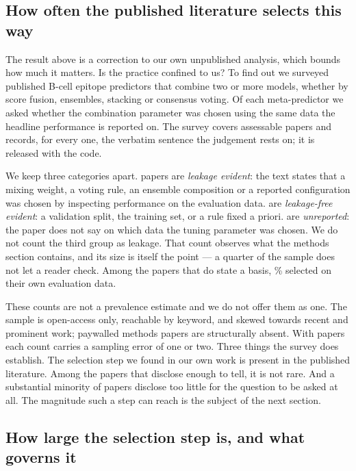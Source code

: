 \subsection{How often the published literature selects this way}
\label{sec:survey}

The result above is a correction to our own unpublished analysis, which bounds
how much it matters. Is the practice confined to us? To find out we surveyed
published B-cell epitope predictors that combine two or more models, whether
by score fusion, ensembles, stacking or consensus voting. Of each
meta-predictor we asked whether the combination parameter was chosen using the
same data the headline performance is reported on. The survey covers
\SurveyAssessed{} assessable papers and records, for every one, the verbatim
sentence the judgement rests on; it is released with the code.

We keep three categories apart. \SurveyLeakage{} papers are \emph{leakage
evident}: the text states that a mixing weight, a voting rule, an ensemble
composition or a reported configuration was chosen by inspecting performance
on the evaluation data. \SurveyClean{} are \emph{leakage-free evident}: a
validation split, the training set, or a rule fixed a priori.
\SurveyUnreported{} are \emph{unreported}: the paper does not say on which
data the tuning parameter was chosen. We do not count the third group as
leakage. That count observes what the methods section contains, and its size is
itself the point --- a quarter of the sample does not let a reader check.
Among the \SurveyStatingBasis{} papers that do state a basis,
\SurveyLeakageShare{}\% selected on their own evaluation data.

These counts are not a prevalence estimate and we do not offer them as one.
The sample is open-access only, reachable by keyword, and skewed towards
recent and prominent work; paywalled methods papers are structurally absent.
With \SurveyAssessed{} papers each count carries a sampling error of one or
two. Three things the survey does establish. The selection step we found in our
own work is present in the published literature. Among the papers that
disclose enough to tell, it is not rare. And a substantial minority of papers
disclose too little for the question to be asked at all. The magnitude such a
step can reach is the subject of the next section.

\subsection{How large the selection step is, and what governs it}
\label{sec:bias-curve}

